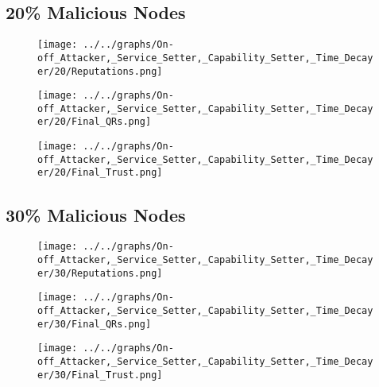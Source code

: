 \begin{minipage}[t]{0.49\columnwidth}
\subsection*{20\% Malicious Nodes}
    \begin{figure}[H]
        \centering
        \texttt{[image: ../../graphs/On-off\_Attacker,\_Service\_Setter,\_Capability\_Setter,\_Time\_Decayer/20/Reputations.png]}
    \end{figure}
    \begin{figure}[H]
        \centering
        \texttt{[image: ../../graphs/On-off\_Attacker,\_Service\_Setter,\_Capability\_Setter,\_Time\_Decayer/20/Final\_QRs.png]}
    \end{figure}
\end{minipage}
\begin{minipage}[t]{0.49\columnwidth}
    \begin{figure}[H]
        \centering
        \texttt{[image: ../../graphs/On-off\_Attacker,\_Service\_Setter,\_Capability\_Setter,\_Time\_Decayer/20/Final\_Trust.png]}
    \end{figure}
\end{minipage}

\begin{minipage}[t]{0.49\columnwidth}
\subsection*{30\% Malicious Nodes}
    \begin{figure}[H]
        \centering
        \texttt{[image: ../../graphs/On-off\_Attacker,\_Service\_Setter,\_Capability\_Setter,\_Time\_Decayer/30/Reputations.png]}
    \end{figure}
    \begin{figure}[H]
        \centering
        \texttt{[image: ../../graphs/On-off\_Attacker,\_Service\_Setter,\_Capability\_Setter,\_Time\_Decayer/30/Final\_QRs.png]}
    \end{figure}
\end{minipage}
\begin{minipage}[t]{0.49\columnwidth}
    \begin{figure}[H]
        \centering
        \texttt{[image: ../../graphs/On-off\_Attacker,\_Service\_Setter,\_Capability\_Setter,\_Time\_Decayer/30/Final\_Trust.png]}
    \end{figure}
\end{minipage}


